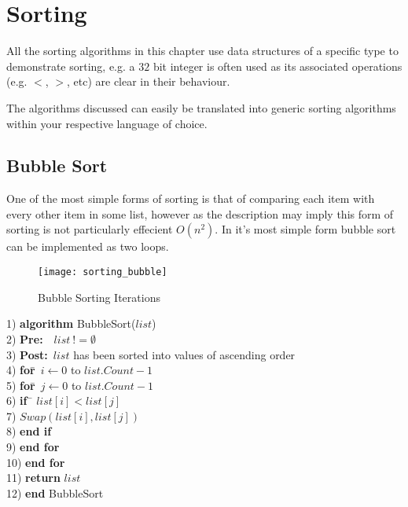 \chapter{Sorting}
All the sorting algorithms in this chapter use data structures of a specific type to demonstrate sorting, e.g. a $32$ bit integer is often used as its associated operations (e.g. $<$, $>$, etc) are clear in their behaviour.

The algorithms discussed can easily be translated into generic sorting algorithms within your respective language of choice.
\newpage
\section{Bubble Sort}
One of the most simple forms of sorting is that of comparing each item with every other item in some list, however as the description may imply this form of sorting is not particularly effecient $O(n^{2})$. In it's most simple form bubble sort can be implemented as two loops.

\begin{figure}[h]
\begin{center}
\texttt{[image: sorting\_bubble]}
\end{center}
\caption{Bubble Sorting Iterations} \label{fig:sorting_bubble}
\end{figure}

\begin{tabbing}
1)  \textbf{alg}\= \textbf{orithm} BubbleSort($list$) \\
2)  \> \textbf{Pre:}~~$list~!= \emptyset$ \\
3)  \> \textbf{Post:}~$list$ has been sorted into values of ascending order \\
4)  \> \textbf{for}\=~$i \leftarrow 0$ to $list.Count - 1$ \\
5)  \> \> \textbf{for}\=~$j \leftarrow 0$ to $list.Count - 1$ \\
6)  \> \> \> \textbf{if}~\= $list[i] < list[j]$ \\
7)  \> \> \> \> $Swap(list[i], list[j])$ \\
8)  \> \> \> \textbf{end if} \\
9)  \> \> \textbf{end for} \\
10) \> \textbf{end for} \\
11) \> \textbf{return} $list$ \\
12) \textbf{end} BubbleSort
\end{tabbing}

